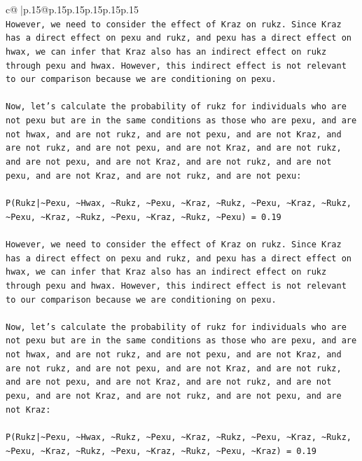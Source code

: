 \documentclass{article}
\begin{document}
{\begin{supertabular}{c@{$\;$}|p{.15\linewidth}@{}p{.15\linewidth}p{.15\linewidth}p{.15\linewidth}p{.15\linewidth}p{.15\linewidth}}
{{{\\ 
\texttt{However, we need to consider the effect of Kraz on rukz. Since Kraz has a direct effect on pexu and rukz, and pexu has a direct effect on hwax, we can infer that Kraz also has an indirect effect on rukz through pexu and hwax. However, this indirect effect is not relevant to our comparison because we are conditioning on pexu.} \\
\\ 
\texttt{Now, let's calculate the probability of rukz for individuals who are not pexu but are in the same conditions as those who are pexu, and are not hwax, and are not rukz, and are not pexu, and are not Kraz, and are not rukz, and are not pexu, and are not Kraz, and are not rukz, and are not pexu, and are not Kraz, and are not rukz, and are not pexu, and are not Kraz, and are not rukz, and are not pexu:} \\
\\ 
\texttt{P(Rukz|\textasciitilde{}Pexu, \textasciitilde{}Hwax, \textasciitilde{}Rukz, \textasciitilde{}Pexu, \textasciitilde{}Kraz, \textasciitilde{}Rukz, \textasciitilde{}Pexu, \textasciitilde{}Kraz, \textasciitilde{}Rukz, \textasciitilde{}Pexu, \textasciitilde{}Kraz, \textasciitilde{}Rukz, \textasciitilde{}Pexu, \textasciitilde{}Kraz, \textasciitilde{}Rukz, \textasciitilde{}Pexu) = 0.19} \\
\\ 
\texttt{However, we need to consider the effect of Kraz on rukz. Since Kraz has a direct effect on pexu and rukz, and pexu has a direct effect on hwax, we can infer that Kraz also has an indirect effect on rukz through pexu and hwax. However, this indirect effect is not relevant to our comparison because we are conditioning on pexu.} \\
\\ 
\texttt{Now, let's calculate the probability of rukz for individuals who are not pexu but are in the same conditions as those who are pexu, and are not hwax, and are not rukz, and are not pexu, and are not Kraz, and are not rukz, and are not pexu, and are not Kraz, and are not rukz, and are not pexu, and are not Kraz, and are not rukz, and are not pexu, and are not Kraz, and are not rukz, and are not pexu, and are not Kraz:} \\
\\ 
\texttt{P(Rukz|\textasciitilde{}Pexu, \textasciitilde{}Hwax, \textasciitilde{}Rukz, \textasciitilde{}Pexu, \textasciitilde{}Kraz, \textasciitilde{}Rukz, \textasciitilde{}Pexu, \textasciitilde{}Kraz, \textasciitilde{}Rukz, \textasciitilde{}Pexu, \textasciitilde{}Kraz, \textasciitilde{}Rukz, \textasciitilde{}Pexu, \textasciitilde{}Kraz, \textasciitilde{}Rukz, \textasciitilde{}Pexu, \textasciitilde{}Kraz) = 0.19} \\
}}}
\end{supertabular}}
\end{document}
